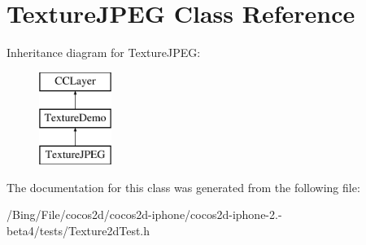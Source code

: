 \hypertarget{interface_texture_j_p_e_g}{\section{Texture\-J\-P\-E\-G Class Reference}
\label{interface_texture_j_p_e_g}
}
Inheritance diagram for Texture\-J\-P\-E\-G\-:\begin{figure}[H]
\begin{center}
\leavevmode
\includegraphics[height=3.000000cm]{interface_texture_j_p_e_g}
\end{center}
\end{figure}


The documentation for this class was generated from the following file\-:\begin{DoxyCompactItemize}
\item 
/\-Bing/\-File/cocos2d/cocos2d-\/iphone/cocos2d-\/iphone-\/2.-\/beta4/tests/Texture2d\-Test.\-h\end{DoxyCompactItemize}
